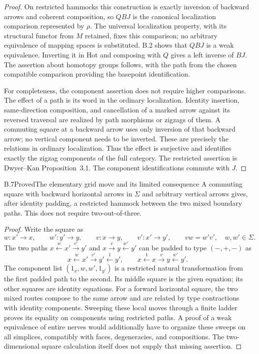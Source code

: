 \begin{proof}
On restricted hammocks this construction is exactly inversion of backward arrows and coherent composition, so $QBJ$ is the canonical localization comparison represented by $\rho$. The universal localization property, with its structural functor from $M$ retained, fixes this comparison; no arbitrary equivalence of mapping spaces is substituted. B.2 shows that $QBJ$ is a weak equivalence. Inverting it in $\mathrm{Hot}$ and composing with $Q$ gives a left inverse of $BJ$. The assertion about homotopy groups follows, with the path from the chosen compatible comparison providing the basepoint identification.

For completeness, the component assertion does not require higher comparisons. The effect of a path is its word in the ordinary localization. Identity insertion, same-direction composition, and cancellation of a marked arrow against its reversed traversal are realized by path morphisms or zigzags of them. A commuting square at a backward arrow uses only inversion of that backward arrow; no vertical component needs to be inverted. These are precisely the relations in ordinary localization. Thus the effect is surjective and identifies exactly the zigzag components of the full category. The restricted assertion is Dwyer--Kan Proposition~3.1. The component identifications commute with $J$.
\end{proof}

\begin{result}{B.7}{Proved}{The elementary grid move and its limited consequence}
A commuting square with backward horizontal arrows in $\Sigma$ and arbitrary vertical arrows gives, after identity padding, a restricted hammock between the two mixed boundary paths. This does not require two-out-of-three.
\end{result}
\begin{proof}
Write the square as
\[
 w:x'\to x,\qquad w':y'\to y,\qquad
 v:x\to y,\qquad v':x'\to y',\qquad vw=w'v',
 \quad w,w'\in\Sigma.
\]
The two paths $x\xleftarrow{w}x'\xrightarrow{v'}y'$ and
$x\xrightarrow{v}y\xleftarrow{w'}y'$ can be padded to type $(-,+,-)$ as
\[
 x\xleftarrow{w}x'\xrightarrow{v'}y'\xleftarrow{1}y',
 \qquad
 x\xleftarrow{1}x\xrightarrow{v}y\xleftarrow{w'}y'.
\]
The component list $(1_x,w,w',1_{y'})$ is a restricted natural transformation from the first padded path to the second. Its middle square is the given equation; its other squares are identity equations. For a forward horizontal square, the two mixed routes compose to the same arrow and are related by type contractions with identity components. Sweeping these local moves through a finite ladder proves its equality on components using restricted paths. A proof of a weak equivalence of entire nerves would additionally have to organize these sweeps on all simplices, compatibly with faces, degeneracies, and compositions. The two-dimensional square calculation itself does not supply that missing assertion.
\end{proof}

